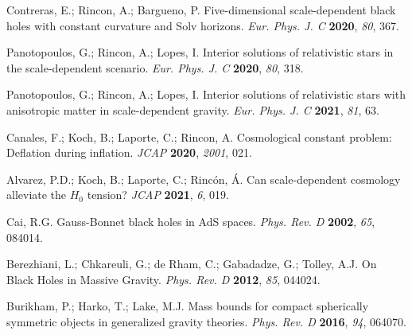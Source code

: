 \documentclass[aps,amsmath,amssymb,twocolumn]{revtex4}
\begin{document}
\begin{thebibliography}{999}
  Contreras, E.; Rincon, A.; Bargueno, P. 
  Five-dimensional scale-dependent black holes with constant curvature and Solv horizons.
  \emph{Eur. Phys. J. C} \textbf{2020}, {\em 80},  367. 
  
 Panotopoulos, G.; Rincon, A.; Lopes, I. 
  Interior solutions of relativistic stars in the scale-dependent scenario.
  \emph{Eur. Phys. J. C} \textbf{2020},  {\em 80},  318.

 Panotopoulos, G.; Rincon, A.; Lopes, I. 
  Interior solutions of relativistic stars with anisotropic matter in scale-dependent gravity.
  \emph{Eur. Phys. J. C} \textbf{2021}, {\em 81},   63.
  
 Canales, F.; Koch, B.; Laporte, C.; Rincon, A. 
  Cosmological constant problem: Deflation during inflation.
  \emph{JCAP} \textbf{2020}, {\em 2001}, 021.
  
Alvarez, P.D.; Koch, B.; Laporte, C.; Rinc\'on, \'A. 
Can scale-dependent cosmology alleviate the $H_0$ tension? 
\emph{JCAP} \textbf{2021}, \emph{6}, 019.



  Cai, R.G. 
  Gauss-Bonnet black holes in AdS spaces.
  \emph{Phys. Rev. D} \textbf{2002}, {\em 65}, 084014.


 Berezhiani, L.; Chkareuli, G.; de Rham, C.; Gabadadze, G.; Tolley, A.J. 
  On Black Holes in Massive Gravity.
  \emph{Phys. Rev. D} \textbf{2012}, {\em 85}, 044024.


 Burikham, P.; Harko, T.; Lake, M.J. 
  Mass bounds for compact spherically symmetric objects in generalized gravity theories.
  \emph{Phys. Rev. D} \textbf{2016}, {\em 94},   064070. 


\end{thebibliography}
\end{document}

